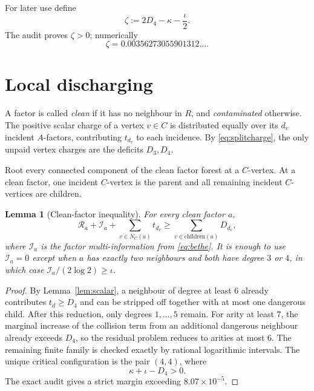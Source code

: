 \documentclass[11pt]{article}
\newtheorem{lemma}[theorem]{Lemma}
\begin{document}
For later use define
\begin{equation}\label{eq:zeta}
 \zeta:=2D_4-\kappa-\frac\iota2.
\end{equation}
The audit proves $\zeta>0$; numerically
\[
 \zeta=0.00356273055901312\ldots .
\]

\section{Local discharging}

A factor is called \emph{clean} if it has no neighbour in $R$, and \emph{contaminated} otherwise.
The positive scalar charge of a vertex $v\in C$ is distributed equally over its $d_v$ incident $A$-factors, contributing $t_{d_v}$ to each incidence.  By \eqref{eq:splitcharge}, the only unpaid vertex charges are the deficits $D_3,D_4$.

Root every connected component of the clean factor forest at a $C$-vertex.  At a clean factor, one incident $C$-vertex is the parent and all remaining incident $C$-vertices are children.

\begin{lemma}[Clean-factor inequality]\label{lem:clean}
For every clean factor $a$,
\begin{equation}\label{eq:cleanlocal}
 \mathcal R_a+\mathcal I_a
 +\sum_{v\in N_C(a)}t_{d_v}
 \ge
 \sum_{v\in \mathrm{children}(a)}D_{d_v},
\end{equation}
where $\mathcal I_a$ is the factor multi-information from \eqref{eq:bethe}.  It is enough to use $\mathcal I_a=0$ except when $a$ has exactly two neighbours and both have degree $3$ or $4$, in which case $\mathcal I_a/(2\log2)\ge\iota$.
\end{lemma}

\begin{proof}
By Lemma~\ref{lem:scalar}, a neighbour of degree at least $6$ already contributes $t_d\ge D_4$ and can be stripped off together with at most one dangerous child.  After this reduction, only degrees $1,\ldots,5$ remain.  For arity at least $7$, the marginal increase of the collision term from an additional dangerous neighbour already exceeds $D_4$, so the residual problem reduces to arities at most $6$.
The remaining finite family is checked exactly by rational logarithmic intervals.  The unique critical configuration is the pair $(4,4)$, where
\[
 \kappa+\iota-D_4>0.
\]
The exact audit gives a strict margin exceeding $8.07\times10^{-5}$.
\end{proof}
\end{document}
